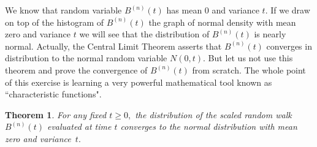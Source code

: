 \documentclass[reqno,psamsfonts, 10pt]{amsart}
\newtheorem{thm}{Theorem}
\theoremstyle{remark}
\begin{document}
We know that random variable $B^{(n)}(t)$ has mean $0$ and
variance $t.$ If we draw on top of the histogram of
$B^{(n)}(t)$ the graph of normal density with mean zero and
variance $t$ we will see that the distribution of
$B^{(n)}(t)$ is nearly normal. Actually, the Central Limit
Theorem asserts that $B^{(n)}(t)$ converges in distribution
to the normal random variable $N(0,t).$ But let us not use
this theorem and prove the convergence of $B^{(n)}(t)$ from
scratch. The whole point of this exercise is learning a
very powerful mathematical tool known as ``characteristic
functions".

\begin{thm}
For any fixed $t \ge 0,$ the distribution of the scaled
random walk $B^{(n)}(t)$ evaluated at time $t$ converges to
the normal distribution with mean zero and variance~$t.$
\end{thm}
\end{document}
